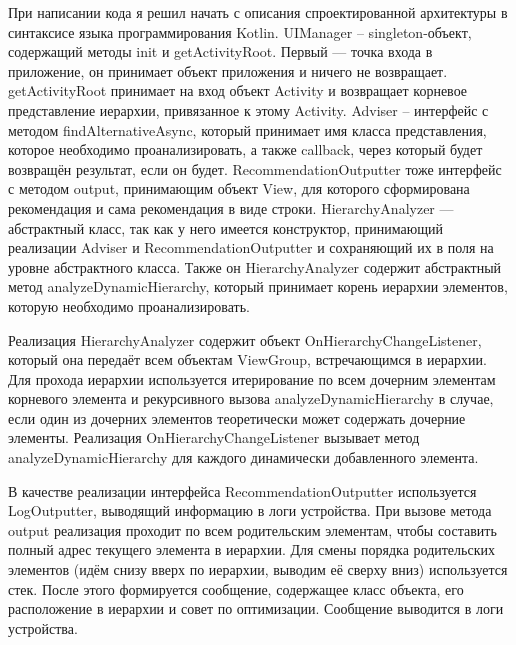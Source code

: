 \documentclass[a4paper,14pt]{extarticle} %
\begin{document}
	При написании кода я решил начать с описания спроектированной архитектуры в синтаксисе языка программирования Kotlin. UIManager – singleton-объект, содержащий методы init и getActivityRoot. Первый ---  точка входа в приложение, он принимает объект приложения и ничего не возвращает. getActivityRoot принимает на вход объект Activity и возвращает корневое представление иерархии, привязанное к этому Activity. Adviser – интерфейс с методом findAlternativeAsync, который принимает имя класса представления, которое необходимо проанализировать, а также callback, через который будет возвращён результат, если он будет. RecommendationOutputter тоже интерфейс с методом output, принимающим объект View, для которого сформирована рекомендация и сама рекомендация в виде строки. HierarchyAnalyzer ---  абстрактный класс, так как у него имеется конструктор, принимающий реализации Adviser и RecommendationOutputter и сохраняющий их в поля на уровне абстрактного класса. Также он HierarchyAnalyzer содержит абстрактный метод analyzeDynamicHierarchy, который принимает корень иерархии элементов, которую необходимо проанализировать.
	
	Реализация HierarchyAnalyzer содержит объект OnHierarchyChangeListener, который она передаёт всем объектам ViewGroup, встречающимся в иерархии. Для прохода иерархии используется итерирование по всем дочерним элементам корневого элемента и рекурсивного вызова analyzeDynamicHierarchy в случае, если один из дочерних элементов теоретически может содержать дочерние элементы. Реализация OnHierarchyChangeListener вызывает метод analyzeDynamicHierarchy для каждого динамически добавленного элемента.
	
	В качестве реализации интерфейса RecommendationOutputter используется LogOutputter, выводящий информацию в логи устройства. При вызове метода output реализация проходит по всем родительским элементам, чтобы составить полный адрес текущего элемента в иерархии. Для смены порядка родительских элементов (идём снизу вверх по иерархии, выводим её сверху вниз) используется стек. После этого формируется сообщение, содержащее класс объекта, его расположение в иерархии и совет по оптимизации. Сообщение выводится в логи устройства.
	
\end{document}
